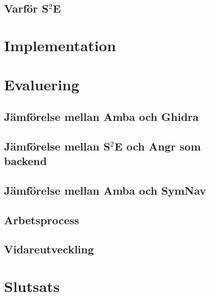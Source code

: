 \documentclass[12pt,a4paper]{report}
\newcommand{\stoe}{S$^2$E\xspace}
\begin{document}
\section{Varför \stoe{}}


\cleardoublepage
\chapter{Implementation}\label{chap:implementation}


\cleardoublepage
\chapter{Evaluering}\label{chap:evaluering}

\section{Jämförelse mellan Amba och Ghidra}\label{sec:amba-vs-ghidra}

\section{Jämförelse mellan \stoe{} och Angr som \\ backend}\label{sec:amba-vs-ghidra}

\section{Jämförelse mellan Amba och SymNav}\label{sec:amba-vs-symnav}

\section{Arbetsprocess}\label{sec:arbetsprocess}

\section{Vidareutveckling}\label{sec:vidareutveckling}


\cleardoublepage
\chapter{Slutsats}\label{chap:slutsats}


\cleardoublepage
\renewcommand*{\bibfont}{\footnotesize}
\printbibliography[title=Referenser]
\end{document}
